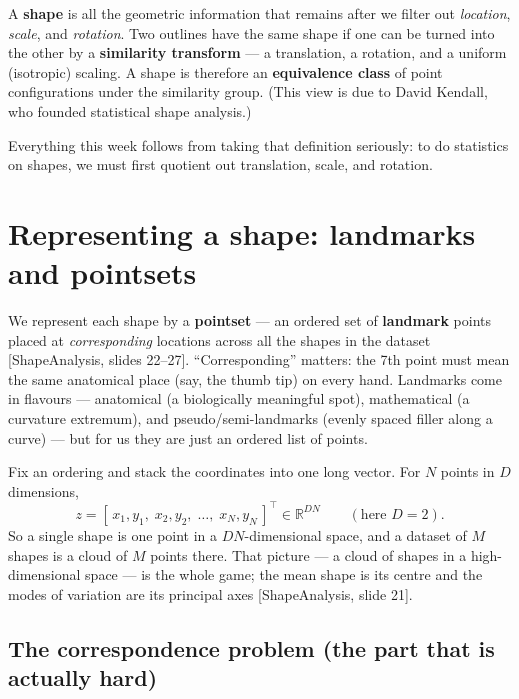 \documentclass[11pt]{article}
\newcommand{\R}{\mathbb{R}}
\newcommand{\deck}[1]{\textsf{\small[#1]}}
\begin{document}
\begin{keybox}
A \textbf{shape} is all the geometric information that remains after we filter
out \emph{location}, \emph{scale}, and \emph{rotation}. Two outlines have the
same shape if one can be turned into the other by a \textbf{similarity
transform} --- a translation, a rotation, and a uniform (isotropic) scaling. A
shape is therefore an \textbf{equivalence class} of point configurations under
the similarity group. (This view is due to David Kendall, who founded
statistical shape analysis.)
\end{keybox}

Everything this week follows from taking that definition seriously: to do
statistics on shapes, we must first quotient out translation, scale, and
rotation.

\section{Representing a shape: landmarks and pointsets}

We represent each shape by a \textbf{pointset} --- an ordered set of
\textbf{landmark} points placed at \emph{corresponding} locations across all the
shapes in the dataset \deck{ShapeAnalysis, slides 22--27}. ``Corresponding''
matters: the 7th point must mean the same anatomical place (say, the thumb tip)
on every hand. Landmarks come in flavours --- anatomical (a biologically
meaningful spot), mathematical (a curvature extremum), and pseudo/semi-landmarks
(evenly spaced filler along a curve) --- but for us they are just an ordered list
of points.

Fix an ordering and stack the coordinates into one long vector. For $N$ points in
$D$ dimensions,
\[
z = [\,x_1,y_1,\;x_2,y_2,\;\dots,\;x_N,y_N\,]^{\!\top} \in \R^{DN}
\qquad(\text{here } D=2).
\]
So a single shape is one point in a $DN$-dimensional space, and a dataset of $M$
shapes is a cloud of $M$ points there. That picture --- a cloud of shapes in a
high-dimensional space --- is the whole game; the mean shape is its centre and
the modes of variation are its principal axes \deck{ShapeAnalysis, slide 21}.

\subsection{The correspondence problem (the part that is actually hard)}
\end{document}
